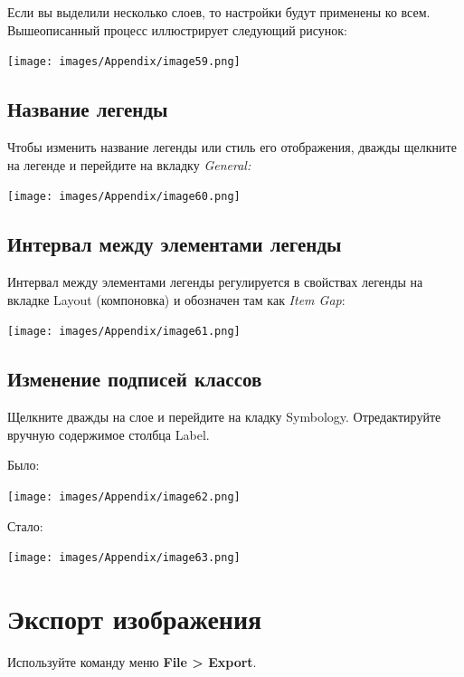 \documentclass[12pt,]{book}
\begin{document}
Если вы выделили несколько слоев, то настройки будут применены ко всем. Вышеописанный процесс иллюстрирует следующий рисунок:

\texttt{[image: images/Appendix/image59.png]}

\hypertarget{section-59}{%
\section{Название легенды}\label{section-59}}

Чтобы изменить название легенды или стиль его отображения, дважды щелкните на легенде и перейдите на вкладку \emph{General:}

\texttt{[image: images/Appendix/image60.png]}

\hypertarget{section-60}{%
\section{Интервал между элементами легенды}\label{section-60}}

Интервал между элементами легенды регулируется в свойствах легенды на вкладке Layout (компоновка) и обозначен там как \emph{Item Gap}:

\texttt{[image: images/Appendix/image61.png]}

\hypertarget{section-61}{%
\section{Изменение подписей классов}\label{section-61}}

Щелкните дважды на слое и перейдите на кладку Symbology. Отредактируйте вручную содержимое столбца Label.

Было:

\texttt{[image: images/Appendix/image62.png]}

Стало:

\texttt{[image: images/Appendix/image63.png]}

\hypertarget{manual-export}{%
\chapter{Экспорт изображения}\label{manual-export}}

Используйте команду меню \textbf{File \textgreater{} Export}.

\printbibliography
\end{document}
